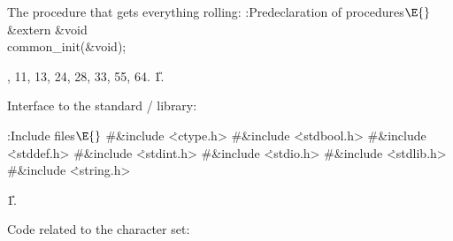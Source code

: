 The procedure that gets everything rolling:
\Y\B\4:Predeclaration of procedures\X${}\E{}$\6
\&{extern} \&{void} \\{common\_init}(\&{void});\par
{}, 11, 13, 24, 28, 33, 55, 64.
\U1.\fi

Interface to the standard \CEE/ library:

\Y\B\4:Include files\X${}\E{}$\6
\8\#\&{include} \.{<ctype.h>}\6
\8\#\&{include} \.{<stdbool.h>}\6
\8\#\&{include} \.{<stddef.h>}\6
\8\#\&{include} \.{<stdint.h>}\6
\8\#\&{include} \.{<stdio.h>}\6
\8\#\&{include} \.{<stdlib.h>}\6
\8\#\&{include} \.{<string.h>}\par
\U1.\fi

Code related to the character set:

